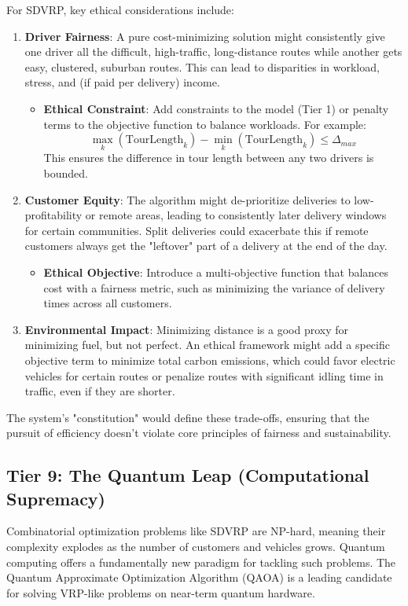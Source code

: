 \documentclass{article}
\begin{document}
For SDVRP, key ethical considerations include:
\begin{enumerate}
    \item \textbf{Driver Fairness}: A pure cost-minimizing solution might consistently give one driver all the difficult, high-traffic, long-distance routes while another gets easy, clustered, suburban routes. This can lead to disparities in workload, stress, and (if paid per delivery) income.
        \begin{itemize}
            \item \textbf{Ethical Constraint}: Add constraints to the model (Tier 1) or penalty terms to the objective function to balance workloads. For example: 
            \begin{equation}
            \max_k(\text{TourLength}_k) - \min_k(\text{TourLength}_k) \leq \Delta_{max}
            \end{equation}
            This ensures the difference in tour length between any two drivers is bounded.
        \end{itemize}
    \item \textbf{Customer Equity}: The algorithm might de-prioritize deliveries to low-profitability or remote areas, leading to consistently later delivery windows for certain communities. Split deliveries could exacerbate this if remote customers always get the "leftover" part of a delivery at the end of the day.
        \begin{itemize}
            \item \textbf{Ethical Objective}: Introduce a multi-objective function that balances cost with a fairness metric, such as minimizing the variance of delivery times across all customers.
        \end{itemize}
    \item \textbf{Environmental Impact}: Minimizing distance is a good proxy for minimizing fuel, but not perfect. An ethical framework might add a specific objective term to minimize total carbon emissions, which could favor electric vehicles for certain routes or penalize routes with significant idling time in traffic, even if they are shorter.
\end{enumerate}
The system's "constitution" would define these trade-offs, ensuring that the pursuit of efficiency doesn't violate core principles of fairness and sustainability.

\subsection{Tier 9: The Quantum Leap (Computational Supremacy)}
Combinatorial optimization problems like SDVRP are NP-hard, meaning their complexity explodes as the number of customers and vehicles grows. Quantum computing offers a fundamentally new paradigm for tackling such problems. The Quantum Approximate Optimization Algorithm (QAOA) is a leading candidate for solving VRP-like problems on near-term quantum hardware.
\end{document}
